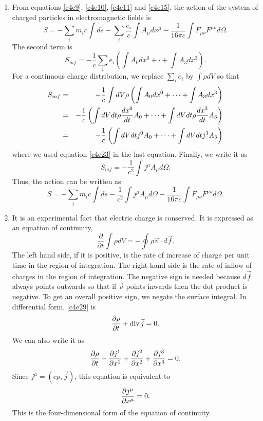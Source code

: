 \begin{enumerate}
\item From equations \eqref{c4e9}, \eqref{c4e10}, \eqref{c4e11} and \eqref{c4e15},
the action of the system of charged particles in electromagnetic fields is
\[
S = -\sum_i m_ic\int ds - \sum_i\frac{e_i}{c}\int A_\mu dx^\mu - \frac{1}{16\pi c}
\int F_{\mu\nu} F^{\mu\nu} d\Omega.
\]
The second term is
\[
S_{mf} = -\frac{1}{c}\sum_i e_i\left(\int A_0dx^0 + \cdot + \int A_3dx^3\right).
\]
For a continuous charge distribution, we replace $\sum_i e_i$ by $\int \rho dV$
so that
\begin{eqnarray*}
S_{mf} &=& -\frac{1}{c}\int dV \rho\left(\int A_0dx^0 + \cdots + \int A_3dx^3\right) \\
 &=& -\frac{1}{c}\left(\int dVdt \rho\frac{d{x^0}}{d{t}}A_0 + \cdots + \int dVdt \rho\frac{d{x^3}}{d{t}}A_3\right) \\
 &=& -\frac{1}{c}\left(\int dVdt j^0A_0 + \cdots + \int dVdt j^3A_3\right)
\end{eqnarray*}
where we used equation \eqref{c4e23} in the last equation. Finally, we write it
as
\begin{equation}\label{c4e27}
S_{mf} = -\frac{1}{c^2}\int j^\mu A_\mu d\Omega.
\end{equation}
Thus, the action can be written as
\begin{equation}\label{c4e28}
S = -\sum_i m_ic\int ds - \frac{1}{c^2}\int j^\mu A_\mu d\Omega - 
\frac{1}{16\pi c}\int F_{\mu\nu} F^{\mu\nu} d\Omega.
\end{equation}

\item It is an experimental fact that electric charge is conserved. It is expressed
as an equation of continuity,
\begin{equation}\label{c4e29}
\frac{\partial}{\partial t}\int\rho dV = -\oint \rho\vec{v}\cdot d\vec{f}.
\end{equation}
The left hand side, if it is positive, is the rate of increase of charge per unit
time in the region of integration. The right hand side is the rate of inflow of
charges in the region of integration. The negative sign is needed because $d\vec{f}$
always points outwards so that if $\vec{v}$ points inwards then the dot product 
is negative. To get an overall positive sign, we negate the surface integral.
In differential form, \eqref{c4e29} is
\begin{equation}\label{c4e30}
\frac{\partial{\rho}}{\partial{t}} + \operatorname{div}\vec{j} = 0.
\end{equation}
We can also write it as
\[
\frac{\partial{\rho}}{\partial{t}} + \frac{\partial{j^1}}{\partial{x^1}} + \frac{\partial{j^2}}{\partial{x^2}} + \frac{\partial{j^3}}{\partial{x^3}} = 0.
\]
Since $j^\mu = (c\rho, \vec{j})$, this equation is equivalent to
\begin{equation}\label{c4e31}
\frac{\partial{j^\mu}}{\partial{x^\mu}} = 0.
\end{equation}
This is the four-dimensional form of the equation of continuity.


\end{enumerate}
